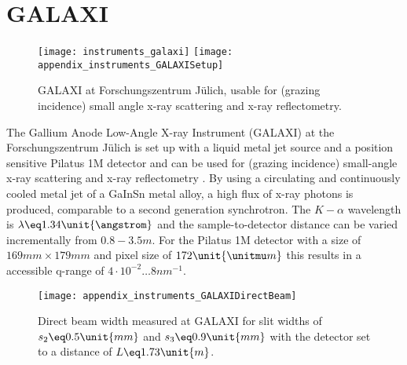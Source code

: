 \documentclass[\main/dresen_thesis.tex]{subfiles}
\begin{document}
  \section{GALAXI}\label{ch:lss:galaxi}
    \begin{figure}[ht]
      \centering
      \texttt{[image: instruments\_galaxi]}
      \texttt{[image: appendix\_instruments\_GALAXISetup]}
      \caption{\label{fig:lss:galaxi}GALAXI at Forschungszentrum J\"ulich, usable for (grazing incidence) small angle x-ray scattering and x-ray reflectometry.}
    \end{figure}

    The Gallium Anode Low-Angle X-ray Instrument (GALAXI) at the Forschungszentrum J\"ulich is set up with a liquid metal jet source and a position sensitive Pilatus 1M detector and can be used for (grazing incidence) small-angle x-ray scattering and x-ray reflectometry \cite{FZJ_2016_GALAX}.
    By using a circulating and continuously cooled metal jet of a GaInSn metal alloy, a high flux of x-ray photons is produced, comparable to a second generation synchrotron.
    The $K-\alpha$ wavelength is $\lambda \eq 1.34 \unit{\angstrom}$ and the sample-to-detector distance can be varied incrementally from $0.8 - 3.5 \unit{m}$.
    For the Pilatus 1M detector with a size of $169 \unit{mm} \times 179 \unit{mm}$ and pixel size of $172 \unit{\unitmu m}$ this results in a accessible q-range of $4 \cdot 10^{-2} \dots 8 \unit{nm}^{-1}$.

    \begin{figure}[ht]
      \centering
      \texttt{[image: appendix\_instruments\_GALAXIDirectBeam]}
      \caption{\label{fig:lss:galaxi:directBeam}Direct beam width measured at GALAXI for slit widths of $s_2 \eq 0.5 \unit{mm}$ and $s_3 \eq 0.9 \unit{mm}$ with the detector set to a distance of $L \eq 1.73 \unit{m}$.}
    \end{figure}
\end{document}
